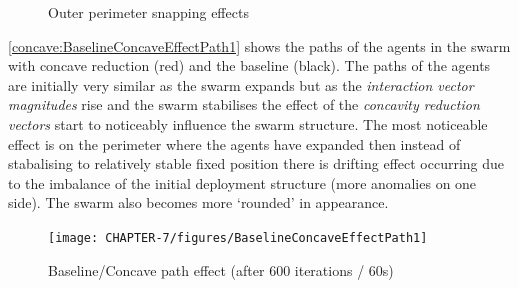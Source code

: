 \begin{figure}[H]
\centering
{}
\caption{Outer perimeter snapping effects}
\label{fig:InducedJitter}
\end{figure}

\autoref{concave:BaselineConcaveEffectPath1} shows the paths of the agents in the swarm with concave reduction (red) and the baseline (black). The paths of the agents are initially very similar as the swarm expands but as the \textit{interaction vector magnitudes} rise and the swarm stabilises the effect of the \textit{concavity reduction vectors} start to noticeably influence the swarm structure. The most noticeable effect is on the perimeter where the agents have expanded then instead of stabalising to relatively stable fixed position there is drifting effect occurring due to the imbalance of the initial deployment structure (more anomalies on one side). The swarm also becomes more `rounded' in appearance. 

\begin{figure}[H]
\begin{center}
\texttt{[image: CHAPTER-7/figures/BaselineConcaveEffectPath1]}
\end{center}
\caption{Baseline/Concave path effect (after 600 iterations / 60s)\label{concave:BaselineConcaveEffectPath1}}
\end{figure}

